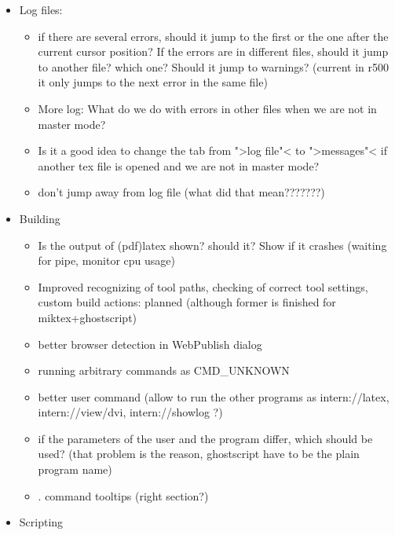 \documentclass[10pt,a4paper,landscape]{report}
\begin{document}
\begin{itemize}
\begin{itemize}
		\item Silbentrennung: \verb+http://homepage.ruhr-uni-bochum.de/Georg.Verweyen/silbentrennung.html+
		\item Respect \verb+\verb+ or even multiline \verb+\begin{verbatim}+
		\item Grammar Checker
		\item LaTeX Checker	(calling lacheck?)
	\end{itemize}
	\item Log files:\begin{itemize}
	\item if there are several errors, should it jump to the first or the one after the current cursor position? If the errors are in different files, should it jump to another file? which one? Should it jump to warnings? 	(current in r500 it only jumps to the next error in the same file) 
		\item More log: What do we do with errors in other files when we are not in master mode? 
		\item Is it a good idea to change the tab from ">log file"< to ">messages"< if another tex file is opened and we are not in master mode?
		\item don't jump away from log file (what did that mean???????)
	\end{itemize}
	\item Building \begin{itemize}
		\item Is the output of (pdf)latex shown? should it? Show if it crashes (waiting for pipe, monitor cpu usage)
		\item Improved recognizing of tool paths, checking of correct tool settings,  custom build actions: planned (although former is finished for miktex+ghostscript)
		\item better browser detection in WebPublish dialog 
		\item running arbitrary commands as CMD\_UNKNOWN
		\item better user command (allow to run the other programs as intern://latex, intern://view/dvi, intern://showlog ?)
		\item if the parameters of the user and the program differ, which should be used? (that problem is the reason, ghostscript have to be the plain program name)
		\item . command tooltips (right section?)
	\end{itemize}
	\item  Scripting

\end{itemize}
\end{document}
